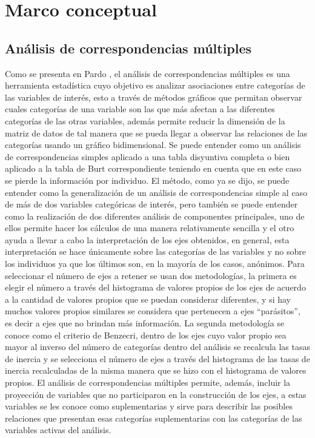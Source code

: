 \documentclass[]{article}
\theoremstyle{definition}
\theoremstyle{definition}
\theoremstyle{definition}
\theoremstyle{remark}
\begin{document}
\section{Marco conceptual}\label{marco}

\subsection{Análisis de correspondencias
múltiples}\label{analisis-de-correspondencias-multiples}

Como se presenta en Pardo \citep[pp.~125 - 163]{Pardo}, el análisis de
correspondencias múltiples es una herramienta estadística cuyo objetivo
es analizar asociaciones entre categorías de las variables de interés,
esto a través de métodos gráficos que permitan observar cuales
categorías de una variable son las que más afectan a las diferentes
categorías de las otras variables, además permite reducir la dimensión
de la matriz de datos de tal manera que se pueda llegar a observar las
relaciones de las categorías usando un gráfico bidimensional. Se puede
entender como un análisis de correspondencias simples aplicado a una
tabla disyuntiva completa o bien aplicado a la tabla de Burt
correspondiente teniendo en cuenta que en este caso se pierde la
información por individuo. El método, como ya se dijo, se puede entender
como la generalización de un análisis de correspondencias simple al caso
de más de dos variables categóricas de interés, pero también se puede
entender como la realización de dos diferentes análisis de componentes
principales, uno de ellos permite hacer los cálculos de una manera
relativamente sencilla y el otro ayuda a llevar a cabo la interpretación
de los ejes obtenidos, en general, esta interpretación se hace
únicamente sobre las categorías de las variables y no sobre los
individuos ya que los últimos son, en la mayoría de los casos, anónimos.
Para seleccionar el número de ejes a retener se usan dos metodologías,
la primera es elegir el número a través del histograma de valores
propios de los ejes de acuerdo a la cantidad de valores propios que se
puedan considerar diferentes, y si hay muchos valores propios similares
se considera que pertenecen a ejes ``parásitos'', es decir a ejes que no
brindan más información. La segunda metodología se conoce como el
criterio de Benzecri, dentro de los ejes cuyo valor propio sea mayor al
inverso del número de categorías dentro del análisis se recalcula las
tasas de inercia y se selecciona el número de ejes a través del
histograma de las tasas de inercia recalculadas de la misma manera que
se hizo con el histograma de valores propios. El análisis de
correspondencias múltiples permite, además, incluir la proyección de
variables que no participaron en la construcción de los ejes, a estas
variables se les conoce como suplementarias y sirve para describir las
posibles relaciones que presentan esas categorías suplementarias con las
categorías de las variables activas del análisis.
\end{document}
